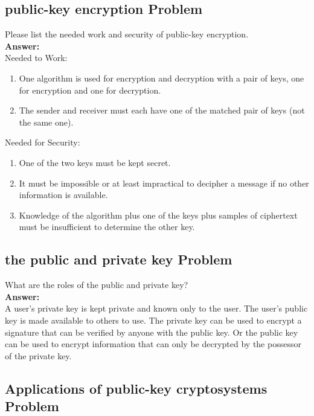 \documentclass[paper=a4, fontsize=11pt]{scrartcl} %
\numberwithin{equation}{section} %
\numberwithin{figure}{section} %
\numberwithin{table}{section} %
\begin{document}
 \subsection{public-key encryption Problem \uppercase\expandafter{}}

 Please list the needed work and security of public-key encryption.\\

 \textbf{Answer:}\\

 Needed to Work:
 \begin{enumerate}
 \item One algorithm is used for encryption and decryption with a pair of keys, one for encryption and one for decryption.
 \item The sender and receiver must each have one of the matched pair of keys (not the same one).
 \end{enumerate}

 Needed for Security:
 \begin{enumerate}
 \item One of the two keys must be kept secret.
 \item It must be impossible or at least impractical to decipher a message if no other information is available.
 \item Knowledge of the algorithm plus one of the keys plus samples of ciphertext must be insufficient to determine the other key.
 \end{enumerate}


 \subsection{the public and private key Problem \uppercase\expandafter{}}

 What are the roles of the public and private key?\\

 \textbf{Answer:}\\

  A user's private key is kept private and known only to the user. The user's public key is made available to others to use. The private key can be used to encrypt a signature that can be verified by anyone with the public key. Or the public key can be used to encrypt information that can only be decrypted by the possessor of the private key.

\subsection{Applications of public-key cryptosystems Problem \uppercase\expandafter{}}
\end{document}
